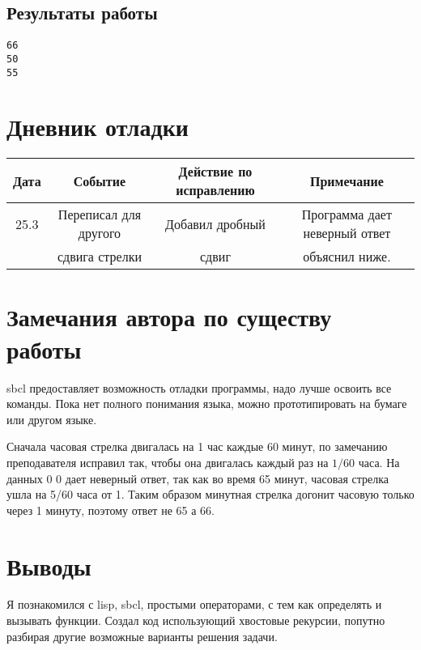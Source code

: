 \documentclass[15pt]{extarticle}
\begin{document}
\subsection{Результаты работы}

\begin{lstlisting}
66 
50 
55
\end{lstlisting}

\section{Дневник отладки}

\begin{tabular}{|c|c|c|c|}
\hline
Дата		&	Событие		&	Действие по исправлению	&	Примечание \\
\hline
25.3		& Переписал для другого  & Добавил дробный & Программа дает неверный ответ \\
		& сдвига стрелки		& сдвиг			&  объяснил ниже. \\
\hline
\end{tabular}

\section{Замечания автора по существу работы}
sbcl предоставляет возможность отладки программы, надо лучше освоить все команды. Пока нет полного понимания языка, можно прототипировать на бумаге или другом языке.

Сначала часовая стрелка двигалась на 1 час каждые 60 минут, по замечанию преподавателя исправил так, чтобы она двигалась каждый раз на $1/60$ часа. На данных 0 0 дает неверный ответ, так как во время 65 минут, часовая стрелка ушла на 5/60 часа от 1. Таким образом минутная стрелка догонит часовую только через 1 минуту, поэтому ответ не 65 а 66.

\section{Выводы}
Я познакомился с lisp, sbcl, простыми операторами, с тем как определять и вызывать функции. Создал код использующий хвостовые рекурсии, попутно разбирая другие возможные варианты решения задачи.
\end{document}
